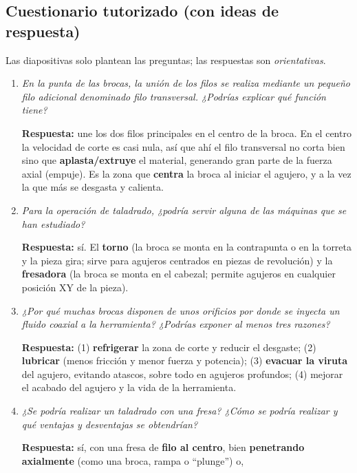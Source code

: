 \documentclass[12pt,a4paper]{article}
\begin{document}
\subsection{Cuestionario tutorizado (con ideas de respuesta)}
Las diapositivas solo plantean las preguntas; las respuestas son
\emph{orientativas}.
\begin{enumerate}
	\item \textit{En la punta de las brocas, la unión de los filos se realiza
		      mediante un pequeño filo adicional denominado filo transversal.
		      ¿Podrías
		      explicar qué función tiene?}\par
	      \textbf{Respuesta:} une los dos filos principales en el centro de la
	      broca. En
	      el centro la velocidad de corte es casi nula, así que ahí el filo
	      transversal no
	      corta bien sino que \textbf{aplasta/extruye} el material, generando gran
	      parte
	      de la fuerza axial (empuje). Es la zona que \textbf{centra} la broca al
	      iniciar
	      el agujero, y a la vez la que más se desgasta y calienta.
	\item \textit{Para la operación de taladrado, ¿podría servir alguna de las
		      máquinas que se han estudiado?}\par
	      \textbf{Respuesta:} sí. El \textbf{torno} (la broca se monta en la
	      contrapunta
	      o en la torreta y la pieza gira; sirve para agujeros centrados en piezas
	      de
	      revolución) y la \textbf{fresadora} (la broca se monta en el cabezal;
	      permite
	      agujeros en cualquier posición XY de la pieza).
	\item \textit{¿Por qué muchas brocas disponen de unos orificios por donde se
		      inyecta un fluido coaxial a la herramienta? ¿Podrías exponer al menos
		      tres
		      razones?}\par
	      \textbf{Respuesta:} (1) \textbf{refrigerar} la zona de corte y reducir
	      el desgaste; (2) \textbf{lubricar} (menos fricción y menor fuerza y
	      potencia);
	      (3) \textbf{evacuar la viruta} del agujero, evitando atascos, sobre todo
	      en
	      agujeros profundos; (4) mejorar el acabado del agujero y la vida de la
	      herramienta.
	\item \textit{¿Se podría realizar un taladrado con una fresa? ¿Cómo se podría
		      realizar y qué ventajas y desventajas se obtendrían?}\par
	      \textbf{Respuesta:} sí, con una fresa de \textbf{filo al centro}, bien
	      \textbf{penetrando axialmente} (como una broca, rampa o ``plunge'') o,

\end{enumerate}
\end{document}
